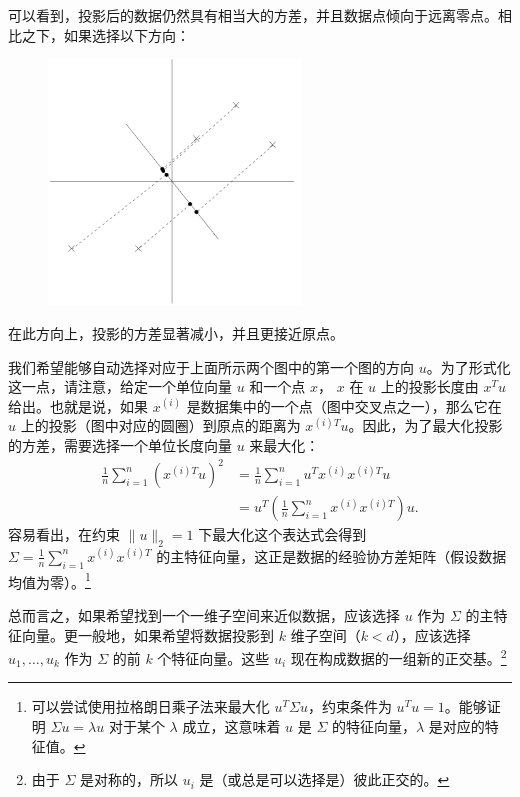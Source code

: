 可以看到，投影后的数据仍然具有相当大的方差，并且数据点倾向于远离零点。相比之下，如果选择以下方向：

\begin{figure}[H]
    \centering
    \includegraphics[width=0.6\textwidth]{figs/PCA_step2.png}
\end{figure}

在此方向上，投影的方差显著减小，并且更接近原点。

我们希望能够自动选择对应于上面所示两个图中的第一个图的方向 $u$。为了形式化这一点，请注意，给定一个单位向量 $u$ 和一个点 $x$， $x$ 在 $u$ 上的投影长度由 $x^T u$ 给出。也就是说，如果 $x^{(i)}$ 是数据集中的一个点（图中交叉点之一），那么它在 $u$ 上的投影（图中对应的圆圈）到原点的距离为 $x^{(i)T} u$。因此，为了最大化投影的方差，需要选择一个单位长度向量 $u$ 来最大化：
\begin{align*}
    \frac{1}{n} \sum_{i=1}^n (x^{(i)T} u)^2 
    &= \frac{1}{n} \sum_{i=1}^n u^T x^{(i)} x^{(i)T} u \\
    &= u^T \left( \frac{1}{n} \sum_{i=1}^n x^{(i)} x^{(i)T} \right) u.
\end{align*}
容易看出，在约束 $\|u\|_2 = 1$ 下最大化这个表达式会得到 $\Sigma = \frac{1}{n} \sum_{i=1}^n x^{(i)} x^{(i)T}$ 的主特征向量，这正是数据的经验协方差矩阵（假设数据均值为零）。\footnote{可以尝试使用拉格朗日乘子法来最大化 $u^T \Sigma u$，约束条件为 $u^T u = 1$。能够证明 $\Sigma u = \lambda u$ 对于某个 $\lambda$ 成立，这意味着 $u$ 是 $\Sigma$ 的特征向量，$\lambda$ 是对应的特征值。}

总而言之，如果希望找到一个一维子空间来近似数据，应该选择 $u$ 作为 $\Sigma$ 的主特征向量。更一般地，如果希望将数据投影到 $k$ 维子空间（$k < d$），应该选择 $u_1, \dots, u_k$ 作为 $\Sigma$ 的前 $k$ 个特征向量。这些 $u_i$ 现在构成数据的一组新的正交基。\footnote{由于 $\Sigma$ 是对称的，所以 $u_i$ 是（或总是可以选择是）彼此正交的。}

